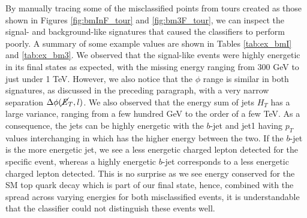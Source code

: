 \newpage
By manually tracing some of the misclassified points from tours created as those shown in Figures \ref{fig:bmInF_tour} and \ref{fig:bm3F_tour}, we can inspect the signal- and background-like signatures that caused the classifiers to perform poorly. A summary of some example values are shown in Tables \ref{tab:ex_bmI} and \ref{tab:ex_bm3}. We observed that the signal-like events were highly energetic in its final states as expected, with the missing energy ranging from 300 GeV to just under 1 TeV. However, we also notice that the $\phi$ range is similar in both signatures, as discussed in the preceding paragraph, with a very narrow separation $\Delta \phi(\cancel{\it{E}}_{T},l)$. We also observed that the energy sum of jets $H_T$ has a large variance, ranging from a few hundred GeV to the order of a few TeV. As a consequence, the jets can be highly energetic with the $b$-jet and jet1 having $p_T$ values interchanging in which has the higher energy between the two. If the $b$-jet is the more energetic jet, we see a less energetic charged lepton detected for the specific event, whereas a highly energetic $b$-jet corresponds to a less energetic charged lepton detected. This is no surprise as we see energy conserved for the SM top quark decay which is part of our final state, hence, combined with the spread across varying energies for both misclassified events, it is understandable that the classifier could not distinguish these events well. \\


